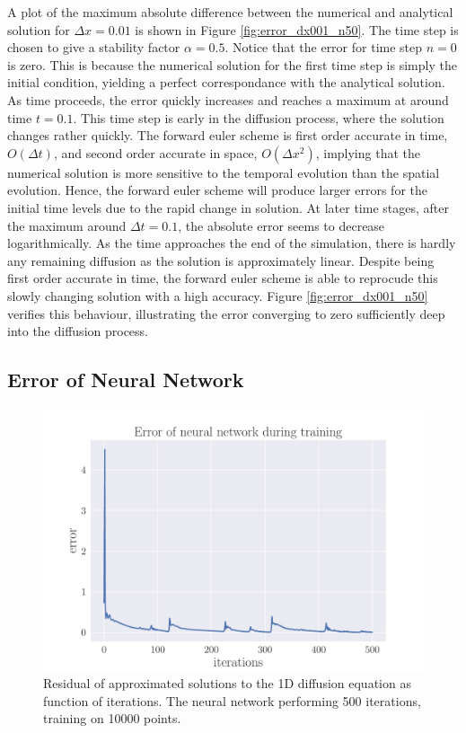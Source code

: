 \documentclass[12pt]{extarticle}
\begin{document}
\par A plot of the maximum absolute difference between the numerical and analytical solution for $\Delta x=0.01$ is shown in Figure \ref{fig:error_dx001_n50}. The time step is chosen to give a stability factor $\alpha=0.5$. Notice that the error for time step $n=0$ is zero. This is because the numerical solution for the first time step is simply the initial condition, yielding a perfect correspondance with the analytical solution. As time proceeds, the error quickly increases and reaches a maximum at around time $t=0.1$. This time step is early in the diffusion process, where the solution changes rather quickly. The forward euler scheme is first order accurate in time, $O(\Delta t)$, and second order accurate in space, $O(\Delta x^2)$, implying that the numerical solution is more sensitive to the temporal evolution than the spatial evolution. Hence, the forward euler scheme will produce larger errors for the initial time levels due to the rapid change in solution. At later time stages, after the maximum around $\Delta t=0.1$, the absolute error seems to decrease logarithmically. As the time approaches the end of the simulation, there is hardly any remaining diffusion as the solution is approximately linear. Despite being first order accurate in time, the forward euler scheme is able to reprocude this slowly changing solution with a high accuracy. Figure \ref{fig:error_dx001_n50} verifies this behaviour, illustrating the error converging to zero sufficiently deep into the diffusion process.

\subsection*{Error of Neural Network}

\begin{figure}[h]
	\centering
	\includegraphics[scale=0.5]{../output/plots/NN_diffusion_error_10000}
	\caption{Residual of approximated solutions to the 1D diffusion equation as function of iterations. The neural network performing 500 iterations, training on 10000 points.}
	\label{fig:error_NN_10000}
\end{figure}
\end{document}
